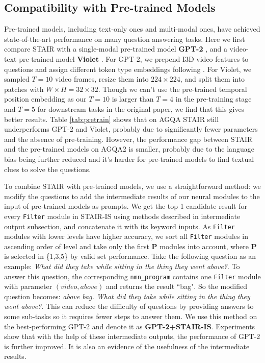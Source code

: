 \documentclass[letterpaper]{article} %
\begin{document}
\subsection{Compatibility with Pre-trained Models}
Pre-trained models, including text-only ones and multi-modal ones, have achieved state-of-the-art performance on many question answering tasks. Here we first compare STAIR with a single-modal pre-trained model \textbf{GPT-2} \cite{Radford2019LanguageMA}, and a video-text pre-trained model \textbf{Violet} \cite{Fu2021VIOLETE}.
For GPT-2, we prepend I3D video features to questions and assign different token type embeddings following \cite{Li2020BridgingTA}.
For Violet, we sampled $T=10$ video frames, resize them into $224 \times 224$, and split them into patches with $W \times H = 32 \times 32$. Though we can't use the pre-trained temporal position embedding as our $T=10$ is larger than $T=4$ in the pre-training stage and $T=5$ for downstream tasks in the original paper, we find that this gives better results. Table \ref{tab:pretrain} shows that on AGQA STAIR still underperforms GPT-2 and Violet, probably due to significantly fewer parameters and the absence of pre-training.
However, the performance gap between STAIR and the pre-trained models on AGQA2 is smaller, probably due to the language bias being further reduced and it's harder for pre-trained models to find textual clues to solve the questions.

To combine STAIR with pre-trained models, we use a straightforward method: we modify the questions to add the intermediate results of our neural modules to the input of pre-trained models as prompts. We get the top 1 candidate result for every \texttt{Filter} module in STAIR-IS using methods described in intermediate output subsection, and concatenate it with its keyword inputs. As \texttt{Filter} modules with lower levels have higher accuracy, we sort all \texttt{Filter} modules in ascending order of level and take only the first $\mathbf{P}$ modules into account, where $\mathbf{P}$ is selected in \{1,3,5\} by valid set performance. Take the following question as an example: \textit{What did they take while sitting in the thing they went above?}. To answer this question, the corresponding \texttt{nmn\_program} contains one \texttt{Filter} module with parameter $(video, above)$ and returns the result ``bag". So the modified question becomes: \textit{above bag. What did they take while sitting in the thing they went above?}. This can reduce the difficulty of questions by providing answers to some sub-tasks so it requires fewer steps to answer them.
We use this method on the best-performing GPT-2 and denote it as \textbf{GPT-2+STAIR-IS}. Experiments show that with the help of these intermediate outputs, the performance of GPT-2 is further improved. It is also an evidence of the usefulness of the intermediate results.
\end{document}
